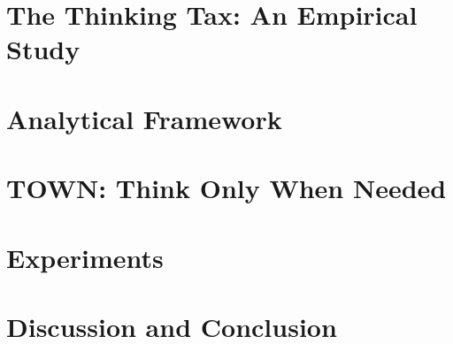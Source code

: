 \documentclass{article}
\newcommand{\method}{\textsc{TOWN}}
\newcommand{\fullmethod}{Think Only When Needed}
\theoremstyle{remark}
\begin{document}


\section{The Thinking Tax: An Empirical Study}
\label{sec:thinking-tax}



\section{Analytical Framework}
\label{sec:theory}



\section{\method{}: \fullmethod{}}
\label{sec:method}



\section{Experiments}
\label{sec:experiments}



\section{Discussion and Conclusion}
\label{sec:conclusion}







\appendix



\end{document}
